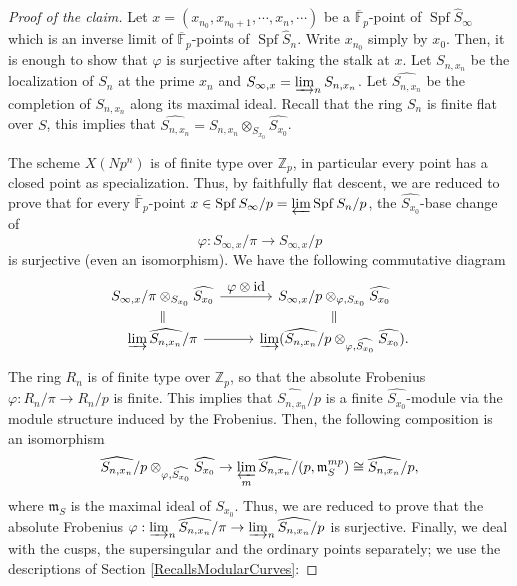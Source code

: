 \documentclass[11pt]{article}
\let\ts\textstyle
\numberwithin{equation}{section}
\theoremstyle{definition}
\newcommand{\bb}[1]{\mathbb{#1}}
\newcommand{\f}[1]{\mathfrak{#1}}
\DeclareMathOperator{\id}{id}
\DeclareMathOperator{\Spf}{Spf}
\newcommand{\mc}[1]{X(Np^{#1})}
\begin{document}
\begin{proof}[Proof of the claim]
Let $x=(x_{n_0}, x_{n_0+1}, \cdots, x_n ,\cdots)$ be a $\overline{\bb{F}}_p$-point of $\Spf \widehat{S}_{\infty}$ which is an inverse limit of $\overline{\bb{F}}_p$-points of $\Spf \widehat{S}_n$. Write $x_{n_0}$ simply by $x_0$. Then, it is enough to show that $\varphi$ is surjective after taking the stalk at $x$. Let $S_{n,x_n}$ be the localization of $S_n$ at the prime $x_n$ and $S_{\infty, x}=\varinjlim_n S_{n, x_n}$. Let $\widehat{S_{n,x_n}}$ be the completion of $S_{n,x_n}$ along its maximal ideal. Recall that the ring $S_{n}$ is finite flat over $S$, this implies that $\widehat{S_{n,x_n}}= S_{n,x_n}\otimes_{S_{x_0}} \widehat{S_{x_0}}$.

The scheme $\mc{n}$ is of finite type over $\bb{Z}_p$, in particular every point has a closed point as specialization. Thus, by faithfully flat descent, we are reduced to prove that for every $\overline{\bb{F}}_p$-point $x \in \Spf S_\infty/p= \varprojlim \Spf S_n/p$, the $\widehat{S_{x_0}}$-base change of\vspace*{-3pt}
\[
\varphi: S_{\infty,x}/\pi\to S_{\infty,x}/p
\]
is surjective (even an isomorphism). We have the following commutative diagram
\begin{equation*}
\begin{tikzcd}[row sep=small]
S_{\infty,x}/\pi \otimes_{S_{x_{0}}}\widehat{S_{x_{0}}} \arrow[r,"\ts \varphi\otimes \id"] & S_{\infty,x}/p \otimes_{\varphi, S_{x_{0}}} \widehat{S_{x_{0}}} \\
\varinjlim \widehat{S_{n,x_n}}/\pi \arrow[r] \arrow[u,equal]& \varinjlim(\widehat{S_{n,x_n}}/p \otimes_{\varphi, \widehat{S_{x_{0}}}} \widehat{S_{x_{0}}}) \arrow[u,equal].
\end{tikzcd}
\end{equation*}
The ring $R_{n}$ is of finite type over $\bb{Z}_{p}$, so that the absolute Frobenius $\varphi: R_{n}/\pi \to R_{n}/p $ is finite. This implies that $\widehat{S_{n,x_n}}/p$ is a finite $\widehat{S_{x_0}}$-module via the module structure induced by the Frobenius. Then, the following composition is an isomorphism
\[
\widehat{S_{n,x_n}}/p \otimes_{\varphi, \widehat{S_{x_{0}}}} \widehat{S_{x_0}}\to \varprojlim_m \widehat{S_{n,x_n}}/(p , \f{m}^{mp}_{S}) \cong\widehat{S_{n,x_n}}/p ,
\]
where $\f{m}_S$ is the maximal ideal of $S_{x_{0}}$.
Thus, we are reduced to prove that the absolute Frobenius $\varphi: \varinjlim_n \widehat{S_{n,x_n}}/\pi \to \varinjlim_n \widehat{S_{n,x_n}}/p $ is surjective. Finally, we deal with the cusps, the supersingular and the ordinary points separately; we use the descriptions of Section \ref{RecallsModularCurves}:


\end{proof}
\end{document}
